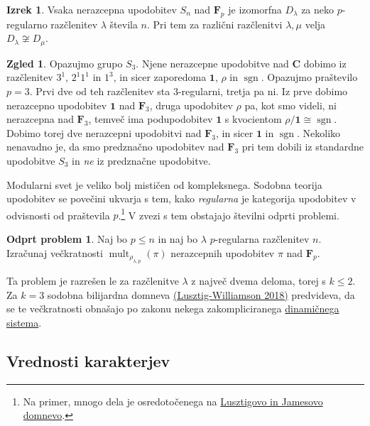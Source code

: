 \documentclass[11pt]{book}
\def\CC{\mathbf{C}}
\def\oneone{\mathbf{1}}
\def\FF{\mathbf{F}}
\DeclareMathOperator\sgn{sgn}
\DeclareMathOperator\mult{mult}
\theoremstyle{definition}
\theoremstyle{zgled}
\newtheorem{zgled}[theorem]{Zgled}
\theoremstyle{zgledbrezstevilke}
\theoremstyle{odprtproblem}
\newtheorem{odprtproblem}[theorem]{Odprt problem}
\theoremstyle{domacanaloga}
\theoremstyle{izrek}
\newtheorem{izrek}[theorem]{Izrek}
\begin{document}
\begin{izrek}
    Vsaka nerazcepna upodobitev $S_n$ nad $\FF_p$ je izomorfna $D_{\lambda}$ za neko $p$-regularno razčlenitev $\lambda$ števila $n$. Pri tem za različni razčlenitvi $\lambda , \mu$ velja $D_{\lambda} \not\cong D_{\mu}$.
\end{izrek}

\begin{zgled}
Opazujmo grupo $S_3$. Njene nerazcepne upodobitve nad $\CC$ dobimo iz razčlenitev $3^1$, $2^1 1^1$ in $1^3$, in sicer zaporedoma $\oneone$, $\rho$ in $\sgn$. Opazujmo praštevilo $p = 3$. Prvi dve od teh razčlenitev sta $3$-regularni, tretja pa ni. Iz prve dobimo nerazcepno upodobitev $\oneone$ nad $\FF_3$, druga upodobitev $\rho$ pa, kot smo videli, ni nerazcepna nad $\FF_3$, temveč ima podupodobitev $\oneone$ s kvocientom $\rho / \oneone \cong \sgn$. Dobimo torej dve nerazcepni upodobitvi nad $\FF_3$, in sicer $\oneone$ in $\sgn$. Nekoliko nenavadno je, da smo predznačno upodobitev nad $\FF_3$ pri tem dobili iz standardne upodobitve $S_3$ in \emph{ne} iz predznačne upodobitve.
\end{zgled}

Modularni svet je veliko bolj mističen od kompleksnega. Sodobna teorija upodobitev se povečini ukvarja s tem, kako \emph{regularna} je kategorija upodobitev v odvisnosti od praštevila $p$.\footnote{Na primer, mnogo dela je osredotočenega na \href{https://mathoverflow.net/questions/138310/what-to-do-now-that-lusztigs-and-james-conjectures-have-been-shown-to-be-false}{Lusztigovo in Jamesovo domnevo}.} V zvezi s tem obstajajo številni odprti problemi.

\begin{odprtproblem}
Naj bo $p \leq n$ in naj bo $\lambda$ $p$-regularna razčlenitev $n$. Izračunaj večkratnosti $\mult_{\rho_{\lambda,p}}(\pi)$ nerazcepnih upodobitev $\pi$ nad $\FF_p$.
\end{odprtproblem}

Ta problem je razrešen le za razčlenitve $\lambda$ z največ dvema deloma, torej s $k \leq 2$. Za $k = 3$ sodobna bilijardna domneva \href{https://arxiv.org/pdf/1703.05898.pdf}{(Lusztig-Williamson 2018)} predvideva, da se te večkratnosti obnašajo po zakonu nekega zakompliciranega \href{https://www.youtube.com/watch?v=Ru0Zys1Vvq4}{dinamičnega sistema}.

\subsection{Vrednosti karakterjev}
\end{document}
